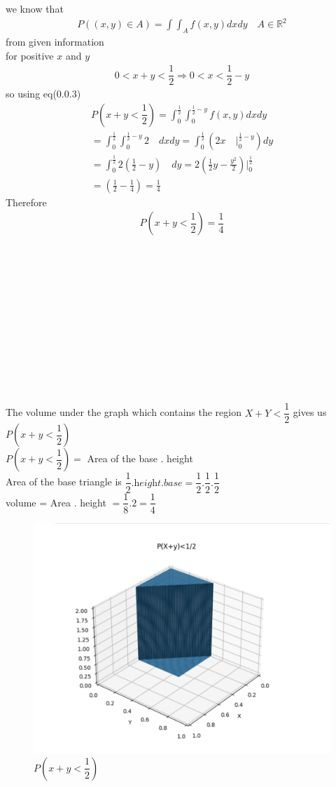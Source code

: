 \documentclass[journal,12pt,twocolumn]{IEEEtran}
\begin{document}
we know that
\begin{align}
    P\left(\left(x,y\right)\in A\right)=\int \int _{A}f\left(x,y\right) dx dy \quad  A \in \mathbb{R}^2
\end{align}
from given information\\
for positive $x$ and $y$
\begin{align}
    0<x+y<\dfrac{1}{2}  \Rightarrow 0<x<\dfrac{1}{2}-y
\end{align}
so using eq(0.0.3)
\begin{align}
    P\left(x+y < \dfrac{1}{2}\right)=\int_{0}^{\frac{1}{2}} \int _{0}^{\frac{1}{2}-y}f(x,y) dx dy\\
    =\int_{0}^{\frac{1}{2}} \int _{0}^{\frac{1}{2}-y} 2 \quad dx dy
    =\int_{0}^{\frac{1}{2}} \left(  2 x \quad \big|_{0}^{\frac{1}{2}-y} \right)  dy\\
    =\int_{0}^{\frac{1}{2}}   2 \left(\frac{1}{2}-y\right) \quad    dy
    =2\left( \frac{1}{2} y - \frac{y^2}{2}  \right) \big|_{0}^{\frac{1}{2}}\\
    = \left( \frac{1}{2} - \frac{1}{4}\right) = \frac{1}{4} 
\end{align}
Therefore 
\begin{align}
    P\left(x+y<\dfrac{1}{2}\right)=\dfrac{1}{4}
\end{align}
\\
\\
\\
\\
\\
\\
\\
\\
\\
\\
\\
\\
The volume under the graph which contains the region $X+Y<\dfrac{1}{2}$ gives us $P\left(x+y<\dfrac{1}{2}\right)$\\
$P\left(x+y<\dfrac{1}{2}\right)=$ Area of the base . height\\
Area of the base triangle is $\dfrac{1}{2}.\textit{height}.\textit{base}$$= \dfrac{1}{2}.\dfrac{1}{2}.\dfrac{1}{2}$\\
volume = Area . height $= \dfrac{1}{8}. 2= \dfrac{1}{4}$

\begin{figure}[h]
    \centering
    \includegraphics[scale=0.2]{P(x+y_2)_graph.png}
    \caption{$P\left(x+y<\dfrac{1}{2}\right)$}
    \label{fig:p(x+y<1/2)}
\end{figure}
\end{document}
